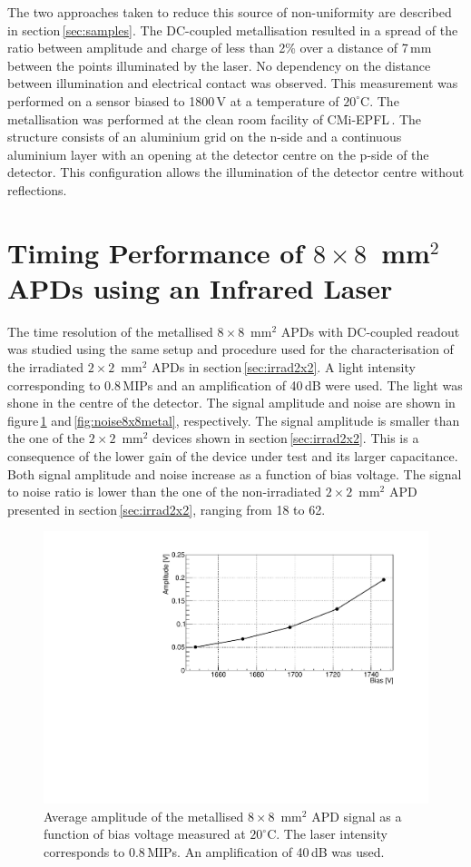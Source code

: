 \documentclass[review,number,sort&compress]{elsarticle}
\begin{document}
The two approaches taken to reduce this source of non-uniformity are described in section\,\ref{sec:samples}.
The DC-coupled metallisation resulted in a spread of the ratio between amplitude and charge of less than 2\% over a distance of 7\,mm between the points illuminated by the laser.
No dependency on the distance between illumination and electrical contact was observed.
This measurement was performed on a sensor biased to 1800\,V at a temperature of $20^\circ$C.
The metallisation was performed at the clean room facility of CMi-EPFL\,\cite{cmi}.
The structure consists of an aluminium grid on the n-side and a continuous aluminium layer with an opening at the detector centre on the p-side of the detector.
This configuration allows the illumination of the detector centre without reflections.

\section{Timing Performance of $8 \times 8$~mm$^2$ APDs using an Infrared Laser}
\label{sec:timing8x8laser}

The time resolution of the metallised $8 \times 8$~mm$^2$ APDs with DC-coupled readout was studied using the same setup and procedure used for the characterisation of the irradiated $2 \times 2$~mm$^2$ APDs in section\,\ref{sec:irrad2x2}.
A light intensity corresponding to 0.8\,MIPs and an amplification of 40\,dB were used.
The light was shone in the centre of the detector.
The signal amplitude and noise are shown in figure\,\ref{fig:ampli8x8metal} and\,\ref{fig:noise8x8metal}, respectively.
The signal amplitude is smaller than the one of the $2 \times 2$~mm$^2$ devices shown in section\,\ref{sec:irrad2x2}.
This is a consequence of the lower gain of the device under test and its larger capacitance.
Both signal amplitude and noise increase as a function of bias voltage.
The signal to noise ratio is lower than the one of the non-irradiated $2 \times 2$~mm$^2$ APD presented in section\,\ref{sec:irrad2x2}, ranging from 18 to 62.

\begin{figure}
  \centering
  \includegraphics[width = 0.6 \columnwidth]{ampli8x8metal}
  \caption{Average amplitude of the metallised $8 \times 8$~mm$^2$ APD signal as a function of bias voltage measured at $20^\circ$C. The laser intensity corresponds to 0.8\,MIPs. An amplification of 40\,dB was used.}
  \label{fig:ampli8x8metal}
\end{figure}
\end{document}
